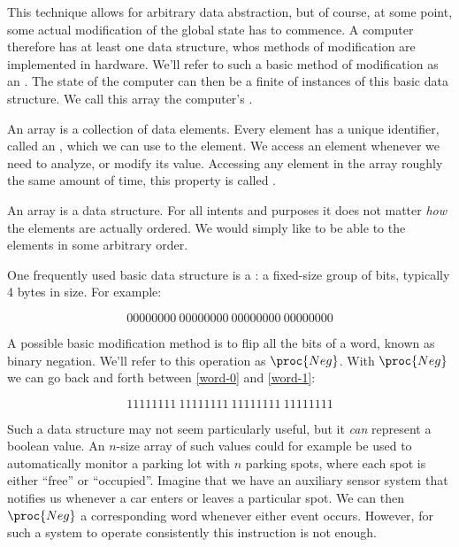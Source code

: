 This technique allows for arbitrary data abstraction, but of course, at some
point, some actual modification of the global state has to commence. A computer
therefore has  at least one  data structure, whos methods of
modification are implemented in hardware. We'll refer to such a basic method of
modification as an . The state of the computer can then be a
finite  of instances of this basic data structure. We call this
array the computer's .

\begin{definition}

An array is a collection of data elements. Every element has a unique
identifier, called an , which we can use to  the
element. We access an element whenever we need to analyze, or modify its value.
Accessing any element in the array roughly the same amount of time, this
property is called .

\end{definition}

An array is a data structure. For all intents and purposes it does not matter
\emph{how} the elements are actually ordered. We would simply like to be able
to  the elements in some arbitrary order.

One frequently used basic data structure is a : a fixed-size group of
bits, typically 4 bytes in size. For example:

\begin{equation}
0000 0000\ 0000 0000\ 0000 0000\ 0000 0000 \label{word-0}
\end{equation}

A possible basic modification method is to flip all the bits of a word, known
as binary negation. We'll refer to this operation as $\proc{Neg}$. With
$\proc{Neg}$ we can go back and forth between \ref{word-0} and \ref{word-1}:

\begin{equation}
1111 1111\ 1111 1111\ 1111 1111\ 1111 1111 \label{word-1}
\end{equation}

Such a data structure may not seem particularly useful, but it \emph{can}
represent a boolean value. An $n$-size array of such values could for example
be used to automatically monitor a parking lot with $n$ parking spots, where
each spot is either ``free'' or ``occupied''. Imagine that we have an auxiliary
sensor system that notifies us whenever a car enters or leaves a particular
spot. We can then $\proc{Neg}$ a corresponding word whenever either event
occurs. However, for such a system to operate consistently this instruction is
not enough.

